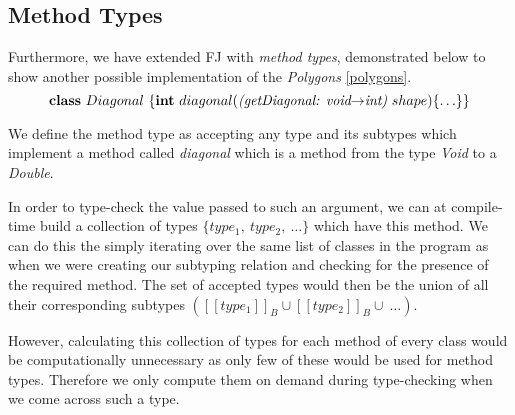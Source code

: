 \documentclass[runningheads]{llncs}
\begin{document}


\subsection{Method Types}

Furthermore, we have extended FJ with \emph{method types}, demonstrated below to show another possible implementation of the \emph{Polygons} \autoref{polygons}.
$$
    \mathbf{class} \  Diagonal \ \{
    \mathbf{int}\ diagonal(\textit{(getDiagonal: void$\rightarrow$int)}  \ shape)\{\ldots\}
    \}
$$

We define the method type as accepting any type and its subtypes which implement a method called \emph{diagonal} which is a method from the type \emph{Void} to a \emph{Double}.

In order to type-check the value passed to such an argument, we can at compile-time build a collection of types $\{type_{1},\ type_{2},\ \ldots\}$ which have this method.
We can do this the simply iterating over the same list of classes in the program as when we were creating our subtyping relation and checking for the presence of the required method.
The set of accepted types would then be the union of all their corresponding subtypes $([\![type_{1}]\!]_{B} \cup [\![type_{2}]\!]_{B} \cup\ \ldots)$.

However, calculating this collection of types for each method of every class would be computationally unnecessary as only few of these would be used for method types.
Therefore we only compute them on demand during type-checking when we come across such a type.
\end{document}

